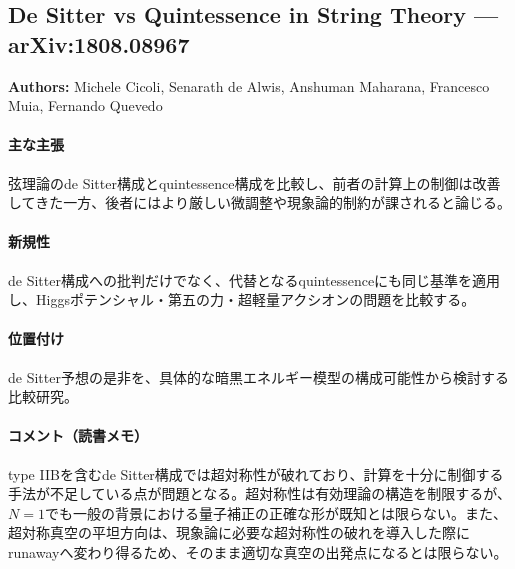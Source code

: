 \subsection{De Sitter vs Quintessence in String Theory --- arXiv:1808.08967}

\textbf{Authors:} Michele Cicoli, Senarath de Alwis, Anshuman Maharana, Francesco Muia, Fernando Quevedo

\paragraph{主な主張}
弦理論のde Sitter構成とquintessence構成を比較し、前者の計算上の制御は改善してきた一方、後者にはより厳しい微調整や現象論的制約が課されると論じる\cite{Cicoli:2018kdo}。

\paragraph{新規性}
de Sitter構成への批判だけでなく、代替となるquintessenceにも同じ基準を適用し、Higgsポテンシャル・第五の力・超軽量アクシオンの問題を比較する。

\paragraph{位置付け}
de Sitter予想の是非を、具体的な暗黒エネルギー模型の構成可能性から検討する比較研究。

\paragraph{コメント（読書メモ）}
type IIBを含むde Sitter構成では超対称性が破れており、計算を十分に制御する手法が不足している点が問題となる。超対称性は有効理論の構造を制限するが、$N=1$でも一般の背景における量子補正の正確な形が既知とは限らない。また、超対称真空の平坦方向は、現象論に必要な超対称性の破れを導入した際にrunawayへ変わり得るため、そのまま適切な真空の出発点になるとは限らない。
